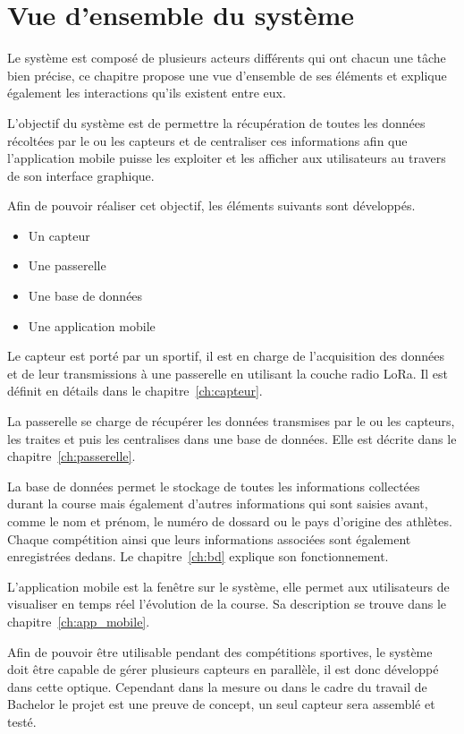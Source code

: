 
\chapter{Vue d'ensemble du système}\label{ch:systeme}

Le système est composé de plusieurs acteurs différents qui ont chacun une tâche bien précise, ce chapitre propose une vue d'ensemble de ses éléments et explique également les interactions qu'ils existent entre eux.

L'objectif du système est de permettre la récupération de toutes les données récoltées par le ou les capteurs et de centraliser ces informations afin que l'application mobile puisse les exploiter et les afficher aux utilisateurs au travers de son interface graphique.

Afin de pouvoir réaliser cet objectif, les éléments suivants sont développés.

\begin{itemize}
\item Un capteur
\item Une passerelle
\item Une base de données
\item Une application mobile
\end{itemize}

Le capteur est porté par un sportif, il est en charge de l'acquisition des données et de leur transmissions à une passerelle en utilisant la couche radio LoRa. Il est définit en détails dans le chapitre~\ref{ch:capteur}.

La passerelle se charge de récupérer les données transmises par le ou les capteurs, les traites et puis les centralises dans une base de données. Elle est décrite dans le chapitre~\ref{ch:passerelle}.

La base de données permet le stockage de toutes les informations collectées durant la course mais également d'autres informations qui sont saisies avant, comme le nom et prénom, le numéro de dossard ou le pays d'origine des athlètes. Chaque compétition ainsi que leurs informations associées sont également enregistrées dedans. Le chapitre~\ref{ch:bd} explique son fonctionnement.

L'application mobile est la fenêtre sur le système, elle permet aux utilisateurs de visualiser en temps réel l'évolution de la course. Sa description se trouve dans le chapitre~\ref{ch:app_mobile}.

Afin de pouvoir être utilisable pendant des compétitions sportives, le système doit être capable de gérer plusieurs capteurs en parallèle, il est donc développé dans cette optique. Cependant dans la mesure ou dans le cadre du travail de Bachelor le projet est une preuve de concept, un seul capteur sera assemblé et testé. 

